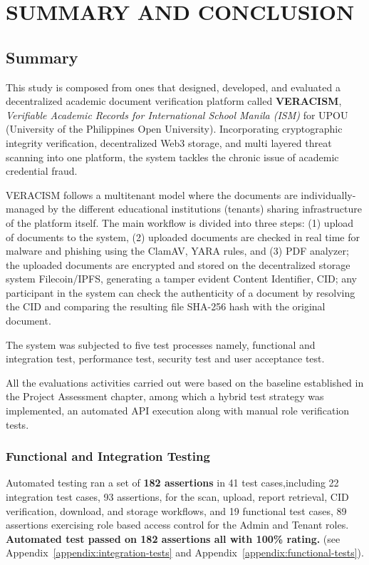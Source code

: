 
\section{SUMMARY AND CONCLUSION}

\subsection{Summary}

This study is composed from ones that designed, developed, and evaluated a decentralized academic document verification platform called \textbf{VERACISM}, \textit{Verifiable Academic Records for International School Manila (ISM)} for UPOU (University of the Philippines Open University). Incorporating cryptographic integrity verification, decentralized Web3 storage, and multi layered threat scanning into one platform, the system tackles the chronic issue of academic credential fraud.

VERACISM follows a multitenant model where the documents are individually-managed by the different educational institutions (tenants) sharing infrastructure of the platform itself. The main workflow is divided into three steps: (1) upload of documents to the system, (2) uploaded documents are checked in real time for malware and phishing using the ClamAV, YARA rules, and (3) PDF analyzer; the uploaded documents are encrypted and stored on the decentralized storage system Filecoin/IPFS, generating a tamper evident Content Identifier, CID; any participant in the system can check the authenticity of a document by resolving the CID and comparing the resulting file SHA-256 hash with the original document.

The system was subjected to five test processes namely, functional and integration test, performance test, security test and user acceptance test.

All the evaluations activities carried out were based on the baseline established in the Project Assessment chapter, among which a hybrid test strategy was implemented, an automated API execution along with manual role verification tests.

\subsubsection{Functional and Integration Testing}

Automated testing ran a set of \textbf{182 assertions} in 41 test cases,including 22 integration test cases, 93 assertions, for the scan, upload, report retrieval, CID verification, download, and storage workflows, and 19 functional test cases, 89 assertions exercising role based access control for the Admin and Tenant roles. \textbf{Automated test passed on 182 assertions all with 100\% rating.}
 (see Appendix~\ref{appendix:integration-tests}
and Appendix~\ref{appendix:functional-tests}).

